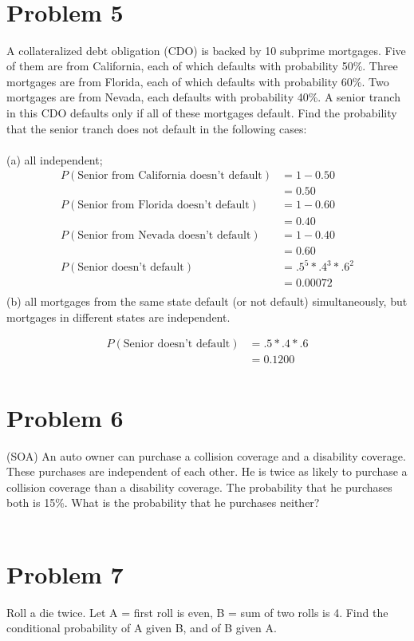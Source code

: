 \documentclass{article}
\begin{document}
	\begin{align*}
	\end{align*}
	
\section*{Problem 5} 
A collateralized debt obligation (CDO) is backed by 10 subprime mortgages. Five of them are from California, each of which defaults with probability 50\%. Three mortgages are from Florida, each of which defaults with probability 60\%. Two mortgages are from Nevada, each defaults with probability 40\%. A senior tranch in this CDO defaults only if all of these mortgages default. Find the probability that the senior tranch does not default in the following cases: \\\\
(a) all independent; \\
	\begin{align*}
	P(\text{Senior from California doesn't default}) &= 1-0.50 \\ &= 0.50 \\
	P(\text{Senior from Florida doesn't default}) &= 1-0.60 \\ &= 0.40 \\
	P(\text{Senior from Nevada doesn't default}) &= 1-0.40 \\ &= 0.60 \\
	P(\text{Senior doesn't default}) &= .5 ^5 * .4^3 * .6^2 \\ &= \mathbf{0.00072 }\\
	\end{align*}
(b) all mortgages from the same state default (or not default) simultaneously, but mortgages in different states are independent. 
	
	\begin{align*}
	P(\text{Senior doesn't default}) &= .5  * .4 * .6 \\ &= \mathbf{0.1200 }\\
	\end{align*}
	
\section*{Problem 6} 
 (SOA) An auto owner can purchase a collision coverage and a disability coverage. These purchases are independent of each other. He is twice as likely to purchase a collision coverage than a disability coverage. The probability that he purchases both is 15\%. What is the probability that he purchases neither?
 
	\begin{align*}
	\end{align*}


\section*{Problem 7} 
Roll a die twice. Let A = {first roll is even}, B = {sum of two rolls is 4}. Find the conditional probability of A given B, and of B given A.  
	\begin{align*}
	\end{align*}
	
\end{document}
